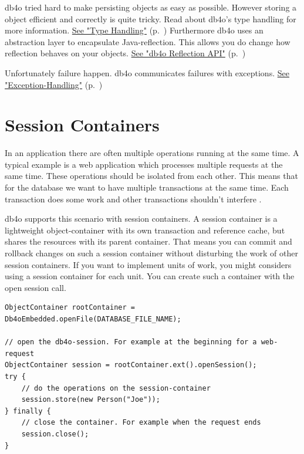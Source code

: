 db4o tried hard to make persisting objects as easy as possible. However storing a object efficient and correctly is quite tricky. Read about db4o's type handling for more information. \hyperref[ref:advanced-topics-type-handling]{See "Type Handling"} (p.~\pageref{ref:advanced-topics-type-handling}) Furthermore db4o uses an abstraction layer to encapsulate Java-reflection. This allows you do change how reflection behaves on your objects. \hyperref[ref:advanced-topics-db4o-reflection-api]{See "db4o Reflection API"} (p.~\pageref{ref:advanced-topics-db4o-reflection-api})

Unfortunately failure happen. db4o communicates failures with exceptions. \hyperref[ref:advanced-topics-exceptions]{See "Exception-Handling"} (p.~\pageref{ref:advanced-topics-exceptions})

\section{Session Containers}
\label{ref:advanced-topics-session-containers}

In an application there are often multiple operations running at the same time. A typical example is a web application which processes multiple requests at the same time. These operations should be isolated from each other. This means that for the database we want to have multiple transactions at the same time. Each transaction does some work and other transactions shouldn't interfere .

db4o supports this scenario with session containers. A session container is a lightweight object-container with its own transaction and reference cache, but shares the resources with its parent container. That means you can commit and rollback changes on such a session container without disturbing the work of other session containers. If you want to implement units of work, you might considers using a session container for each unit. You can create such a container with the open session call.

\begin{lstlisting}
ObjectContainer rootContainer = Db4oEmbedded.openFile(DATABASE_FILE_NAME);

// open the db4o-session. For example at the beginning for a web-request
ObjectContainer session = rootContainer.ext().openSession();
try {
    // do the operations on the session-container
    session.store(new Person("Joe"));
} finally {
    // close the container. For example when the request ends
    session.close();
}
\end{lstlisting}

